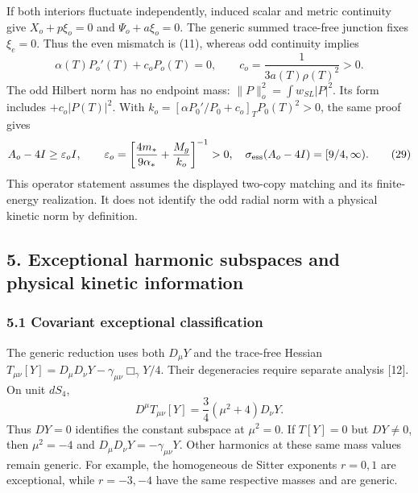 \documentclass[
  11pt,
]{article}
\begin{document}
If both interiors fluctuate independently, induced scalar and metric
continuity give \(X_o+p\xi_o=0\) and \(\Psi_o+a\xi_o=0\). The generic
summed trace-free junction fixes \(\xi_e=0\). Thus the even mismatch is
(11), whereas odd continuity implies \[
 \alpha(T)P_o'(T)+c_oP_o(T)=0,\qquad
 c_o=\frac1{3a(T)\rho(T)^2}>0.                         \tag{28}
\] The odd Hilbert norm has no endpoint mass:
\(\|P\|_o^2=\int w_{SL}|P|^2\). Its form includes \(+c_o|P(T)|^2\). With
\(k_o=[\alpha P_0'/P_0+c_o]_T P_0(T)^2>0\), the same proof gives \[
 A_o-4I\ge\varepsilon_o I,\qquad
 \varepsilon_o=
 \left[\frac{4m_*}{9\alpha_*}+\frac{M_g}{k_o}\right]^{-1}>0,
 \quad \sigma_{\rm ess}(A_o-4I)=[9/4,\infty).
 \tag{29}
\] This operator statement assumes the displayed two-copy matching and
its finite-energy realization. It does not identify the odd radial norm
with a physical kinetic norm by definition.

\subsection{5. Exceptional harmonic subspaces and physical kinetic
information}\label{exceptional-harmonic-subspaces-and-physical-kinetic-information}

\subsubsection{5.1 Covariant exceptional
classification}\label{covariant-exceptional-classification}

The generic reduction uses both \(D_\mu Y\) and the trace-free Hessian
\(T_{\mu\nu}[Y]=D_\mu D_\nu Y-\gamma_{\mu\nu}\Box_\gamma Y/4\). Their
degeneracies require separate analysis {[}12{]}. On unit \(dS_4\), \[
 D^\mu T_{\mu\nu}[Y]=\frac34(\mu^2+4)D_\nu Y.
 \tag{30}
\] Thus \(DY=0\) identifies the constant subspace at \(\mu^2=0\). If
\(T[Y]=0\) but \(DY\ne0\), then \(\mu^2=-4\) and
\(D_\mu D_\nu Y=-\gamma_{\mu\nu}Y\). Other harmonics at these same mass
values remain generic. For example, the homogeneous de Sitter exponents
\(r=0,1\) are exceptional, while \(r=-3,-4\) have the same respective
masses and are generic.
\end{document}
